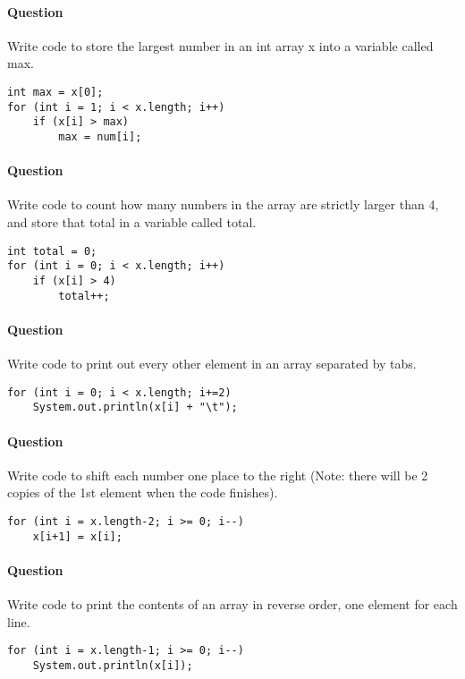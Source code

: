 \documentclass{article}
\begin{document}
\addtocounter{question_num}{1}
\paragraph{Question }
Write code to store the largest number in an int array x into a variable called max.
\begin{lstlisting}
int max = x[0];
for (int i = 1; i < x.length; i++)
	if (x[i] > max)
		max = num[i];
\end{lstlisting}


\addtocounter{question_num}{1}
\paragraph{Question }
Write code to count how many numbers in the array are strictly larger than 4, and store that total in a variable called total.
\begin{lstlisting}
int total = 0;
for (int i = 0; i < x.length; i++)
	if (x[i] > 4)
		total++;
\end{lstlisting}

\addtocounter{question_num}{1}
\paragraph{Question }
Write code to print out every other element in an array separated by tabs.
\begin{lstlisting}
for (int i = 0; i < x.length; i+=2)
	System.out.println(x[i] + "\t");
\end{lstlisting}

\addtocounter{question_num}{1}
\paragraph{Question }
Write code to shift each number one place to the right (Note: there will be 2 copies of the 1st element when the code finishes).
\begin{lstlisting}
for (int i = x.length-2; i >= 0; i--)
	x[i+1] = x[i];
\end{lstlisting}

\addtocounter{question_num}{1}
\paragraph{Question }
Write code to print the contents of an array in reverse order, one element for each line.
\begin{lstlisting}
for (int i = x.length-1; i >= 0; i--)
	System.out.println(x[i]);
\end{lstlisting}
\end{document}
